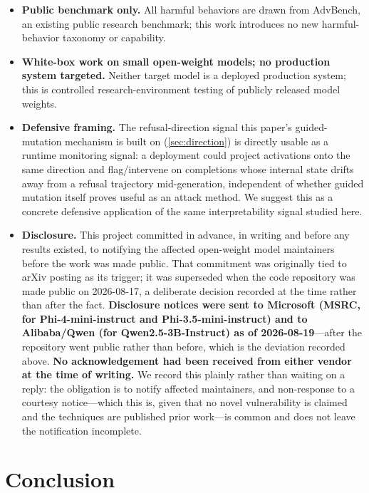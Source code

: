 \documentclass[11pt,letterpaper]{article}
\begin{document}
\begin{itemize}
  \item \textbf{Public benchmark only.} All harmful behaviors are drawn from AdvBench, an
    existing public research benchmark; this work introduces no new harmful-behavior taxonomy or
    capability.
  \item \textbf{White-box work on small open-weight models; no production system targeted.}
    Neither target model is a deployed production system; this is controlled
    research-environment testing of publicly released model weights.
  \item \textbf{Defensive framing.} The refusal-direction signal this paper's guided-mutation
    mechanism is built on (\cref{sec:direction}) is directly usable as a runtime monitoring
    signal: a deployment could project activations onto the same direction and flag/intervene on
    completions whose internal state drifts away from a refusal trajectory mid-generation,
    independent of whether guided mutation itself proves useful as an attack method. We suggest
    this as a concrete defensive application of the same interpretability signal studied here.
  \item \textbf{Disclosure.} This project committed in advance, in writing and before any results
    existed, to notifying the affected open-weight model maintainers before the work was made
    public. That commitment was originally tied to arXiv posting as its trigger; it was
    superseded when the code repository was made public on 2026-08-17, a deliberate decision
    recorded at the time rather than after the fact.
    \textbf{Disclosure notices were sent to Microsoft (MSRC, for Phi-4-mini-instruct and
    Phi-3.5-mini-instruct) and to Alibaba/Qwen (for Qwen2.5-3B-Instruct) as of 2026-08-19}---after
    the repository went public rather than before, which is the deviation recorded above.
    \textbf{No acknowledgement had been received from either vendor at the time of writing.} We
    record this plainly rather than waiting on a reply: the obligation is to notify affected
    maintainers, and non-response to a courtesy notice---which this is, given that no novel
    vulnerability is claimed and the techniques are published prior work---is common and does not
    leave the notification incomplete.
\end{itemize}

\section{Conclusion}
\label{sec:conclusion}
\end{document}

